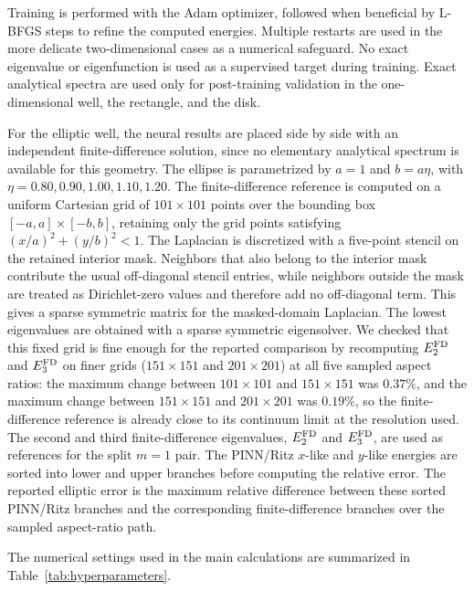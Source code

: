 \documentclass[10pt,onecolumn]{article}
\begin{document}
Training is performed with the Adam optimizer, followed when beneficial by L-BFGS steps to refine the computed energies. Multiple restarts are used in the more delicate two-dimensional cases as a numerical safeguard. No exact eigenvalue or eigenfunction is used as a supervised target during training. Exact analytical spectra are used only for post-training validation in the one-dimensional well, the rectangle, and the disk.

For the elliptic well, the neural results are placed side by side with an independent finite-difference solution, since no elementary analytical spectrum is available for this geometry. The ellipse is parametrized by $a=1$ and $b=a\eta$, with $\eta=0.80,0.90,1.00,1.10,1.20$. The finite-difference reference is computed on a uniform Cartesian grid of $101\times101$ points over the bounding box $[-a,a]\times[-b,b]$, retaining only the grid points satisfying $(x/a)^2+(y/b)^2<1$. The Laplacian is discretized with a five-point stencil on the retained interior mask. Neighbors that also belong to the interior mask contribute the usual off-diagonal stencil entries, while neighbors outside the mask are treated as Dirichlet-zero values and therefore add no off-diagonal term. This gives a sparse symmetric matrix for the masked-domain Laplacian. The lowest eigenvalues are obtained with a sparse symmetric eigensolver. We checked that this fixed grid is fine enough for the reported comparison by recomputing $E_2^{\rm FD}$ and $E_3^{\rm FD}$ on finer grids ($151\times151$ and $201\times201$) at all five sampled aspect ratios: the maximum change between $101\times101$ and $151\times151$ was $0.37\%$, and the maximum change between $151\times151$ and $201\times201$ was $0.19\%$, so the finite-difference reference is already close to its continuum limit at the resolution used. The second and third finite-difference eigenvalues, $E_2^{\rm FD}$ and $E_3^{\rm FD}$, are used as references for the split $m=1$ pair. The PINN/Ritz $x$-like and $y$-like energies are sorted into lower and upper branches before computing the relative error. The reported elliptic error is the maximum relative difference between these sorted PINN/Ritz branches and the corresponding finite-difference branches over the sampled aspect-ratio path.

The numerical settings used in the main calculations are summarized in Table~\ref{tab:hyperparameters}.
\end{document}
